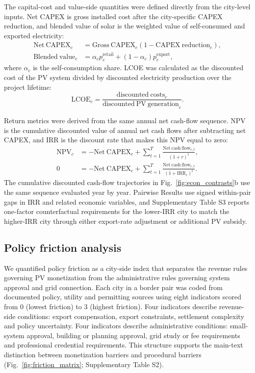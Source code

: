 \documentclass[pdflatex,sn-nature]{sn-jnl}
\begin{document}
The capital-cost and value-side quantities were defined directly from the city-level inputs. Net CAPEX is gross installed cost after the city-specific CAPEX reduction, and blended value of solar is the weighted value of self-consumed and exported electricity:
\begin{align}
\mathrm{Net~CAPEX}_{c} &= \mathrm{Gross~CAPEX}_{c}(1-\mathrm{CAPEX~reduction}_{c}),\\
\mathrm{Blended~value}_{c} &= \alpha_{c}p^{\mathrm{retail}}_{c}+(1-\alpha_{c})p^{\mathrm{export}}_{c},
\end{align}
where $\alpha_{c}$ is the self-consumption share. LCOE was calculated as the discounted cost of the PV system divided by discounted electricity production over the project lifetime:
\begin{equation}
\mathrm{LCOE}_{c}=\frac{\mathrm{discounted~costs}_{c}}{\mathrm{discounted~PV~generation}_{c}}.
\end{equation}

Return metrics were derived from the same annual net cash-flow sequence. NPV is the cumulative discounted value of annual net cash flows after subtracting net CAPEX, and IRR is the discount rate that makes this NPV equal to zero:
\begin{align}
\mathrm{NPV}_{c} &= -\mathrm{Net~CAPEX}_{c}+\sum_{t=1}^{T}\frac{\mathrm{Net~cash~flow}_{c,t}}{(1+r)^t},\\
0 &= -\mathrm{Net~CAPEX}_{c}+\sum_{t=1}^{T}\frac{\mathrm{Net~cash~flow}_{c,t}}{(1+\mathrm{IRR}_{c})^t}.
\end{align}
The cumulative discounted cash-flow trajectories in Fig.~\ref{fig:econ_contrasts}b use the same sequence evaluated year by year. Pairwise Results use signed within-pair gaps in IRR and related economic variables, and Supplementary Table S3 reports one-factor counterfactual requirements for the lower-IRR city to match the higher-IRR city through either export-rate adjustment or additional PV subsidy.

\subsection{Policy friction analysis}

We quantified policy friction as a city-side index that separates the revenue rules governing PV monetization from the administrative rules governing system approval and grid connection. Each city in a border pair was coded from documented policy, utility and permitting sources using eight indicators scored from 0 (lowest friction) to 3 (highest friction). Four indicators describe revenue-side conditions: export compensation, export constraints, settlement complexity and policy uncertainty. Four indicators describe administrative conditions: small-system approval, building or planning approval, grid study or fee requirements and professional credential requirements. This structure supports the main-text distinction between monetization barriers and procedural barriers (Fig.~\ref{fig:friction_matrix}; Supplementary Table S2).
\end{document}
